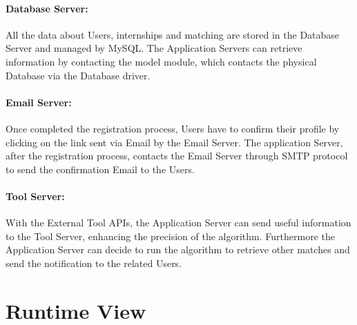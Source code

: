 \paragraph{Database Server:}
All the data about Users, internships and matching are stored in the Database Server and managed by MySQL. The Application Servers can retrieve information by contacting the model module, which contacts the physical Database via the Database driver.

\paragraph{Email Server:}
Once completed the registration process, Users have to confirm their profile by clicking on the link sent via Email by the Email Server. The application Server, after the registration process, contacts the Email Server through SMTP protocol to send the confirmation Email to the Users.

\paragraph{Tool Server:}
With the External Tool APIs, the Application Server can send useful information to the Tool Server, enhancing the precision of the algorithm. Furthermore the Application Server can decide to run the algorithm to retrieve other matches and send the notification to the related Users.

\newpage
\section{Runtime View}
\label{sec:runtime_view}%

